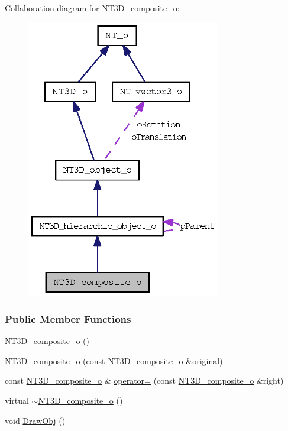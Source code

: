 Collaboration diagram for NT3D\_\-composite\_\-o:
\nopagebreak
\begin{figure}[H]
\begin{center}
\leavevmode
\includegraphics[width=239pt]{class_n_t3_d__composite__o__coll__graph}
\end{center}
\end{figure}
\subsubsection*{Public Member Functions}
\begin{DoxyCompactItemize}
\item 
\hyperlink{class_n_t3_d__composite__o_a8f77bbca8bb892e0eb51387ff3017fc7}{NT3D\_\-composite\_\-o} ()
\item 
\hyperlink{class_n_t3_d__composite__o_a195fb6c3b89f379b78af60c83b594c85}{NT3D\_\-composite\_\-o} (const \hyperlink{class_n_t3_d__composite__o}{NT3D\_\-composite\_\-o} \&original)
\item 
const \hyperlink{class_n_t3_d__composite__o}{NT3D\_\-composite\_\-o} \& \hyperlink{class_n_t3_d__composite__o_aade63a2b5bc8a679f4ab5e65e047b983}{operator=} (const \hyperlink{class_n_t3_d__composite__o}{NT3D\_\-composite\_\-o} \&right)
\item 
virtual \hyperlink{class_n_t3_d__composite__o_ade311dab0a98d9e03fa86272bf845c04}{$\sim$NT3D\_\-composite\_\-o} ()
\item 
void \hyperlink{class_n_t3_d__composite__o_aa8cc1fbcff92f38f7ca21727e93e0886}{DrawObj} ()
\end{DoxyCompactItemize}
